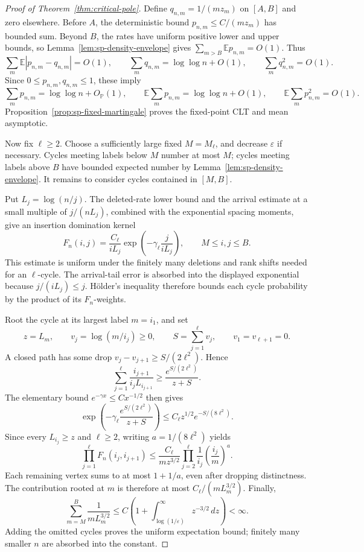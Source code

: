 \documentclass[11pt]{article}
\theoremstyle{remark}
\theoremstyle{plain}
\newcommand{\E}{\mathbb E}
\newcommand{\Pp}{\mathbb P}
\newcommand{\eps}{\varepsilon}
\begin{document}
\begin{proof}[Proof of Theorem~\ref{thm:critical-pole}]
Define $q_{n,m}=1/(mz_m)$ on $[A,B]$ and zero elsewhere.  Before $A$,
the deterministic bound $p_{n,m}\le C/(mz_m)$ has bounded sum.
Beyond $B$, the rates have uniform positive lower and upper bounds,
so Lemma~\ref{lem:sp-density-envelope} gives
$\sum_{m>B}\E p_{n,m}=O(1)$.  Thus
\[
 \sum_m\E|p_{n,m}-q_{n,m}|=O(1),\qquad
 \sum_mq_{n,m}=\log\log n+O(1),\qquad
 \sum_mq_{n,m}^2=O(1).
\]
Since $0\le p_{n,m},q_{n,m}\le1$, these imply
\[
 \sum_mp_{n,m}=\log\log n+O_{\Pp}(1),\qquad
 \E\sum_mp_{n,m}=\log\log n+O(1),\qquad
 \E\sum_mp_{n,m}^2=O(1).
\]
Proposition~\ref{prop:sp-fixed-martingale} proves the fixed-point
CLT and mean asymptotic.

Now fix $\ell\ge2$.  Choose a sufficiently large fixed $M=M_\ell$,
and decrease $\eps$ if necessary.  Cycles meeting labels below $M$
number at most $M$; cycles meeting labels above $B$ have bounded
expected number by Lemma~\ref{lem:sp-density-envelope}.  It remains
to consider cycles contained in $[M,B]$.

Put $L_j=\log(n/j)$.  The deleted-rate lower bound and the arrival
estimate at a small multiple of $j/(nL_j)$, combined with the
exponential spacing moments, give an insertion domination kernel
\[
 F_n(i,j)=\frac{C_\ell}{iL_j}
 \exp\!\left(-\gamma_\ell\frac{j}{iL_j}\right),
 \qquad M\le i,j\le B.
\]
This estimate is uniform under the finitely many deletions and rank
shifts needed for an $\ell$-cycle.  The arrival-tail error is absorbed
into the displayed exponential because $j/(iL_j)\le j$.
H\"older's inequality therefore bounds each cycle probability by
the product of its $F_n$-weights.

Root the cycle at its largest label $m=i_1$, and set
\[
 z=L_m,\qquad v_j=\log(m/i_j)\ge0,\qquad
 S=\sum_{j=1}^{\ell}v_j,\qquad v_1=v_{\ell+1}=0.
\]
A closed path has some drop $v_j-v_{j+1}\ge S/(2\ell^2)$.  Hence
\[
 \sum_{j=1}^{\ell}\frac{i_{j+1}}{i_jL_{i_{j+1}}}
 \ge \frac{e^{S/(2\ell^2)}}{z+S}.
\]
The elementary bound $e^{-\gamma x}\le Cx^{-1/2}$ then gives
\[
 \exp\!\left(-\gamma_\ell
 \frac{e^{S/(2\ell^2)}}{z+S}\right)
 \le C_\ell z^{1/2}e^{-S/(8\ell^2)}.
\]
Since every $L_{i_j}\ge z$ and $\ell\ge2$, writing
$a=1/(8\ell^2)$ yields
\[
 \prod_{j=1}^{\ell}F_n(i_j,i_{j+1})
 \le \frac{C_\ell}{mz^{3/2}}
 \prod_{j=2}^{\ell}\frac1{i_j}\left(\frac{i_j}{m}\right)^a.
\]
Each remaining vertex sums to at most $1+1/a$, even after dropping
distinctness.  The contribution rooted at $m$ is therefore at most
$C_\ell/(mL_m^{3/2})$.  Finally,
\[
 \sum_{m=M}^{B}\frac1{mL_m^{3/2}}
 \le C\left(1+\int_{\log(1/\eps)}^\infty z^{-3/2}\,dz\right)<\infty.
\]
Adding the omitted cycles proves the uniform expectation bound;
finitely many smaller $n$ are absorbed into the constant.
\end{proof}
\end{document}
